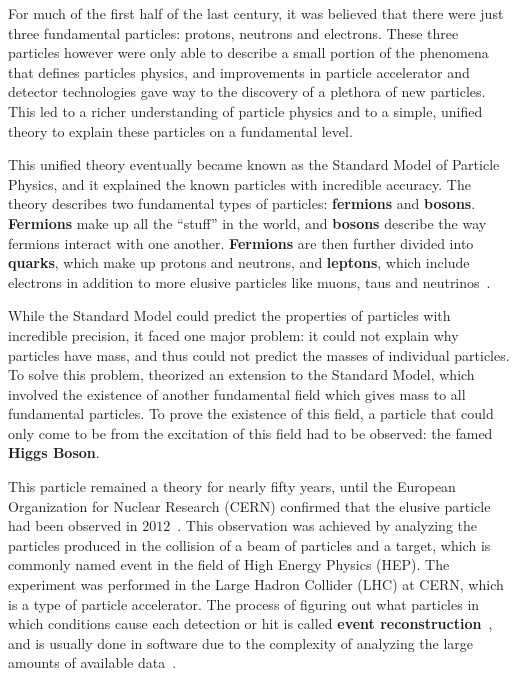  \label{sec:introduction}
For much of the first half of the last century, it was believed that there were just three fundamental particles: protons, neutrons and electrons.
These three particles however were only able to describe a small portion of the phenomena that defines particles physics, and improvements in particle accelerator and detector technologies gave way to the discovery of a plethora of new particles.
This led to a richer understanding of particle physics and to a simple, unified theory to explain these particles on a fundamental level.

This unified theory eventually became known as the Standard Model of Particle Physics, and it explained the known particles with incredible accuracy.
The theory describes two fundamental types of particles: \textbf{fermions} and \textbf{bosons}.
\textbf{Fermions} make up all the ``stuff'' in the world, and \textbf{bosons} describe the way fermions interact with one another.
\textbf{Fermions} are then further divided into \textbf{quarks}, which make up protons and neutrons, and \textbf{leptons}, which include electrons in addition to more elusive particles like muons, taus and neutrinos~\cite{perkins2000introduction}.

While the Standard Model could predict the properties of particles with incredible precision, it faced one major problem: it could not explain why particles have mass, and thus could not predict the masses of individual particles.
To solve this problem, \cite{higgs1964broken} theorized an extension to the Standard Model, which involved the existence of another fundamental field which gives mass to all fundamental particles.
To prove the existence of this field, a particle that could only come to be from the excitation of this field had to be observed: the famed \textbf{Higgs Boson}.

This particle remained a theory for nearly fifty years, until the European Organization for Nuclear Research (CERN) confirmed that the elusive particle had been observed in $2012$~\cite{aad2012observation, collaboration2008cms}.
This observation was achieved by analyzing the particles produced in the collision of a beam of particles and a target, which is commonly named event in the field of High Energy Physics (HEP).
The experiment was performed in the Large Hadron Collider (LHC) at CERN, which is a type of particle accelerator.
The process of figuring out what particles in which conditions cause each detection or hit is called \textbf{event reconstruction}~\cite{leduff2005longitudinal}, and is usually done in software due to the complexity of analyzing the large amounts of available data~\cite{demchenko2013addressing}.

